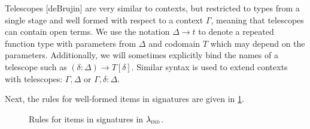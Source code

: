 Telescopes [deBrujin] are very similar to contexts, but restricted to types from a single stage and
well formed with respect to a context $\Gamma$, meaning that telescopes can
contain open terms. We use the notation $\Delta \to t$ to denote a repeated
function type with parameters from $\Delta$ and codomain $T$ which may depend
on the parameters. Additionally, we will sometimes explicitly bind the names of
a telescope such as $(\delta : \Delta) \to T[\delta]$. Similar syntax is used
to extend contexts with telescopes: $\Gamma, \Delta$ or $\Gamma, \delta :
  \Delta$.

Next, the rules for well-formed items in signatures are given in
\cref{fig:lambdaind-item-rules}. 

\begin{figure}[h]
  \caption{Rules for items in signatures in $\lambda_{\textsc{ind}}$.}
  \label{fig:lambdaind-item-rules}
\end{figure}

